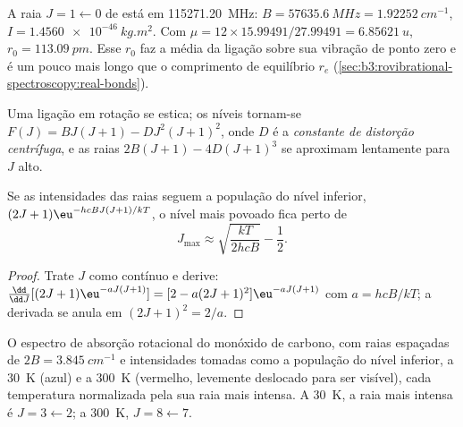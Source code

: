 \begin{example}\label{ex:b3:rovibrational-spectroscopy:co}
A raia $J = 1 \leftarrow 0$ de  está em \qty{115271.20}{MHz}:
$B = \qty{57635.6}{MHz} = \qty{1.92252}{cm^{-1}}$, $I = \qty{1.4560e-46}{kg.m^2}$.
Com $\mu = 12 \times 15.99491/27.99491 = \qty{6.85621}{u}$, $r_0 = \qty{113.09}{pm}$.
Esse $r_0$ faz a média da ligação sobre sua vibração de ponto zero e é um pouco
mais longo que o comprimento de equilíbrio $r_e$ (\cref{sec:b3:rovibrational-spectroscopy:real-bonds}).
\end{example}

\begin{definition}\label{def:b3:rovibrational-spectroscopy:centrifugal}
Uma ligação em rotação se estica; os níveis tornam-se $F(J) = BJ(J+1) - DJ^2(J+1)^2$,
onde $D$ é a \emph{constante de distorção centrífuga},
e as raias $2B(J+1) - 4D(J+1)^3$ se aproximam lentamente para $J$
alto.
\end{definition}

\begin{proposition}\label{prop:b3:rovibrational-spectroscopy:jmax}
Se as intensidades das raias seguem a população do nível inferior, $(2J+1)
\eu^{-hcBJ(J+1)/kT}$, o nível mais povoado fica perto de
\[
J_{\max} \approx \sqrt{\frac{kT}{2hcB}} - \frac12.
\]
\end{proposition}

\begin{proof}
Trate $J$ como contínuo e derive: $\frac{\dd}{\dd J}[(2J+1)\eu^{-aJ(J+1)}]
= [2 - a(2J+1)^2]\eu^{-aJ(J+1)}$ com $a = hcB/kT$; a derivada se anula em $(2J + 1)^2 =
2/a$.
\end{proof}

\begin{omfigure}

{\small O espectro de absorção rotacional do monóxido de carbono, com raias
espaçadas de $2B = \qty{3.845}{cm^{-1}}$ e intensidades tomadas como a população
do nível inferior, a \qty{30}{K} (azul) e a \qty{300}{K} (vermelho, levemente
deslocado para ser visível), cada temperatura normalizada pela sua raia mais
intensa. A \qty{30}{K}, a raia mais intensa é
$J = 3 \leftarrow 2$; a \qty{300}{K}, $J = 8 \leftarrow 7$.}
\end{omfigure}

